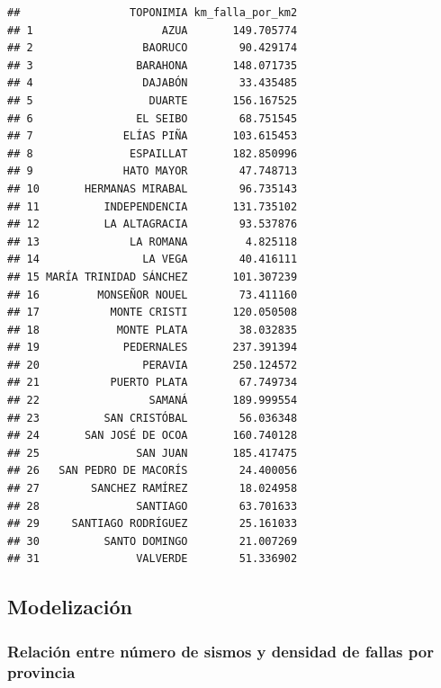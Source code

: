 \documentclass[11pt,]{article}
\newenvironment{Shaded}{\begin{snugshade}}{\end{snugshade}}
\newcommand{\KeywordTok}[1]{\textcolor[rgb]{0.13,0.29,0.53}{\textbf{#1}}}
\newcommand{\DataTypeTok}[1]{\textcolor[rgb]{0.13,0.29,0.53}{#1}}
\newcommand{\StringTok}[1]{\textcolor[rgb]{0.31,0.60,0.02}{#1}}
\newcommand{\OperatorTok}[1]{\textcolor[rgb]{0.81,0.36,0.00}{\textbf{#1}}}
\newcommand{\NormalTok}[1]{#1}
\begin{document}
\begin{verbatim}
##                 TOPONIMIA km_falla_por_km2
## 1                    AZUA       149.705774
## 2                 BAORUCO        90.429174
## 3                BARAHONA       148.071735
## 4                 DAJABÓN        33.435485
## 5                  DUARTE       156.167525
## 6                EL SEIBO        68.751545
## 7              ELÍAS PIÑA       103.615453
## 8               ESPAILLAT       182.850996
## 9              HATO MAYOR        47.748713
## 10       HERMANAS MIRABAL        96.735143
## 11          INDEPENDENCIA       131.735102
## 12          LA ALTAGRACIA        93.537876
## 13              LA ROMANA         4.825118
## 14                LA VEGA        40.416111
## 15 MARÍA TRINIDAD SÁNCHEZ       101.307239
## 16         MONSEÑOR NOUEL        73.411160
## 17           MONTE CRISTI       120.050508
## 18            MONTE PLATA        38.032835
## 19             PEDERNALES       237.391394
## 20                PERAVIA       250.124572
## 21           PUERTO PLATA        67.749734
## 22                 SAMANÁ       189.999554
## 23          SAN CRISTÓBAL        56.036348
## 24       SAN JOSÉ DE OCOA       160.740128
## 25               SAN JUAN       185.417475
## 26   SAN PEDRO DE MACORÍS        24.400056
## 27        SANCHEZ RAMÍREZ        18.024958
## 28               SANTIAGO        63.701633
## 29     SANTIAGO RODRÍGUEZ        25.161033
## 30          SANTO DOMINGO        21.007269
## 31               VALVERDE        51.336902
\end{verbatim}

\subsection{Modelización}\label{modelizaciuxf3n-1}

\subsubsection{Relación entre número de sismos y densidad de fallas por
provincia}\label{relaciuxf3n-entre-nuxfamero-de-sismos-y-densidad-de-fallas-por-provincia}

\begin{Shaded}
\end{Shaded}
\end{document}
